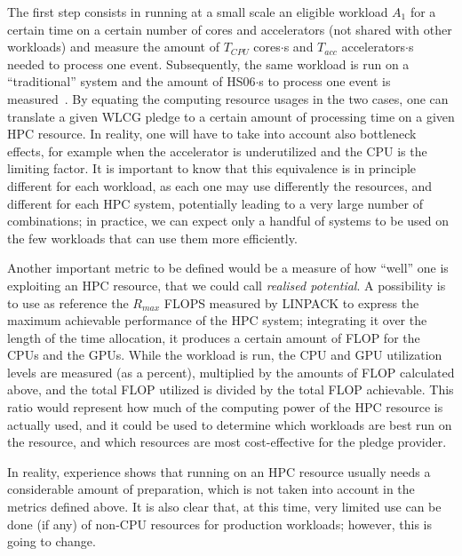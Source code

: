 The first step consists in running at a small scale an eligible
workload $A_1$ for a certain time on a certain number of cores and
accelerators (not shared with other workloads) and measure the amount
of $T_{CPU}$ cores$\cdot$s and $T_{acc}$ accelerators$\cdot$s needed
to process one event. Subsequently, the same workload is run on a
``traditional'' system and the amount of HS06$\cdot$s to process one
event is measured~\cite{hs06}. By equating the computing resource
usages in the two cases, one can translate a given WLCG pledge to a
certain amount of processing time on a given HPC resource. In reality,
one will have to take into account also bottleneck effects, for
example when the accelerator is underutilized and the CPU is the
limiting factor. It is important to know that this equivalence is in
principle different for each workload, as each one may use differently
the resources, and different for each HPC system, potentially leading
to a very large number of combinations; in practice, we can expect
only a handful of systems to be used on the few workloads that can use
them more efficiently.

Another important metric to be defined would be a measure of how
``well'' one is exploiting an HPC resource, that we could call
\emph{realised potential}. A possibility is to use as reference the
$R_{max}$ FLOPS measured by LINPACK to express the
maximum achievable performance of the HPC system; integrating it over
the length of the time allocation, it produces a certain amount of
FLOP for the CPUs and the GPUs. While the workload is run, the CPU and
GPU utilization levels are measured (as a percent), multiplied by the
amounts of FLOP calculated above, and the total FLOP utilized is
divided by the total FLOP achievable. This ratio would represent how
much of the computing power of the HPC resource is actually used, and
it could be used to determine which workloads are best run on the
resource, and which resources are most cost-effective for the pledge
provider.

In reality, experience shows that running on an HPC resource usually
needs a considerable amount of preparation, which is not taken into
account in the metrics defined above. It is also clear that, at this
time, very limited use can be done (if any) of non-CPU resources for
production workloads; however, this is going to change.
